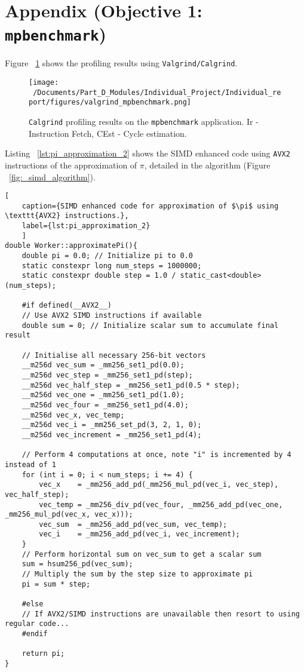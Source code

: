 \newpage
\section{Appendix (Objective 1: \texttt{mpbenchmark})}
\label{sec:app_obj1}

 Figure ~\ref{fig:mpbenchmark_profiled} shows the profiling results using \texttt{Valgrind/Calgrind}. 

\begin{figure}[H] %
	\centering
	\texttt{[image: ~/Documents/Part\_D\_Modules/Individual\_Project/Individual\_report/figures/valgrind\_mpbenchmark.png]} %
	\caption{\texttt{Calgrind} profiling results on the \texttt{mpbenchmark} application. Ir - Instruction Fetch, CEst - Cycle estimation.}
	\label{fig:mpbenchmark_profiled} %
\end{figure} 

Listing ~\ref{lst:pi_approximation_2} shows the SIMD enhanced code using \texttt{AVX2} instructions of the approximation of $\pi$, detailed in the algorithm (Figure ~\ref{fig:_simd_algorithm}).

\begin{lstlisting}[
	caption={SIMD enhanced code for approximation of $\pi$ using \texttt{AVX2} instructions.},
	label={lst:pi_approximation_2}
	]
double Worker::approximatePi(){
	double pi = 0.0; // Initialize pi to 0.0
	static constexpr long num_steps = 1000000; 
	static constexpr double step = 1.0 / static_cast<double>(num_steps); 
	
	#if defined(__AVX2__)
	// Use AVX2 SIMD instructions if available
	double sum = 0; // Initialize scalar sum to accumulate final result
	
	// Initialise all necessary 256-bit vectors
	__m256d vec_sum = _mm256_set1_pd(0.0);
	__m256d vec_step = _mm256_set1_pd(step);
	__m256d vec_half_step = _mm256_set1_pd(0.5 * step); 
	__m256d vec_one = _mm256_set1_pd(1.0); 
	__m256d vec_four = _mm256_set1_pd(4.0); 
	__m256d vec_x, vec_temp; 
	__m256d vec_i = _mm256_set_pd(3, 2, 1, 0); 
	__m256d vec_increment = _mm256_set1_pd(4); 
	
	// Perform 4 computations at once, note "i" is incremented by 4 instead of 1
	for (int i = 0; i < num_steps; i += 4) {
		vec_x    = _mm256_add_pd(_mm256_mul_pd(vec_i, vec_step), vec_half_step); 
		vec_temp = _mm256_div_pd(vec_four, _mm256_add_pd(vec_one, _mm256_mul_pd(vec_x, vec_x))); 
		vec_sum  = _mm256_add_pd(vec_sum, vec_temp); 
		vec_i    = _mm256_add_pd(vec_i, vec_increment); 
	}
	// Perform horizontal sum on vec_sum to get a scalar sum
	sum = hsum256_pd(vec_sum);
	// Multiply the sum by the step size to approximate pi
	pi = sum * step; 
	
	#else
	// If AVX2/SIMD instructions are unavailable then resort to using regular code... 
	#endif
	
	return pi; 
}
\end{lstlisting}

